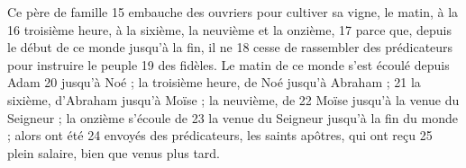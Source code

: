 Ce père de famille	 
15	 	embauche des ouvriers pour cultiver sa vigne, le matin, à la	 
16	 	troisième heure, à la sixième, la neuvième et la onzième,	 
17	 	parce que, depuis le début de ce monde jusqu'à la fin, il ne	 
18	 	cesse de rassembler des prédicateurs pour instruire le peuple	 
19	 	des fidèles. Le matin de ce monde s'est écoulé depuis Adam	 
20	 	jusqu'à Noé ; la troisième heure, de Noé jusqu'à Abraham ;	 
21	 	la sixième, d'Abraham jusqu'à Moïse ; la neuvième, de	 
22	 	Moïse jusqu'à la venue du Seigneur ; la onzième s'écoule de	 
23	 	la venue du Seigneur jusqu'à la fin du monde ; alors ont été	 
24	 	envoyés des prédicateurs, les saints apôtres, qui ont reçu	 
25	 	plein salaire, bien que venus plus tard.